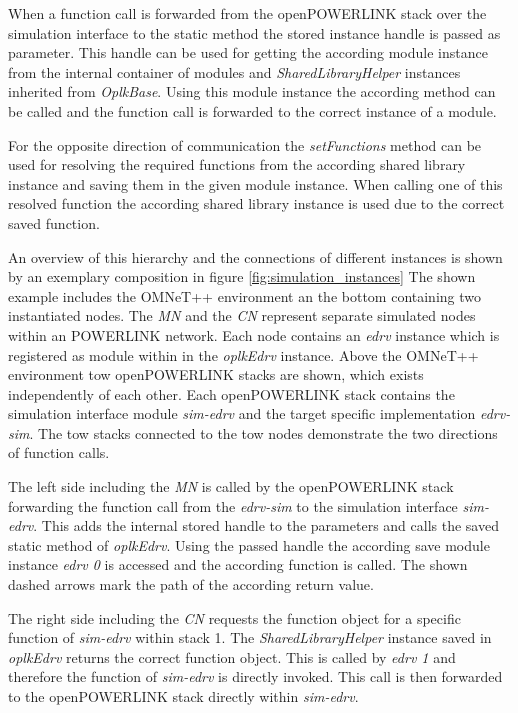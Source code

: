 When a function call is forwarded from the openPOWERLINK stack over the simulation interface to the static method the stored instance handle is passed as parameter.
This handle can be used for getting the according module instance from the internal container of modules and \emph{SharedLibraryHelper} instances inherited from \emph{OplkBase}.
Using this module instance the according method can be called and the function call is forwarded to the correct instance of a module.

For the opposite direction of communication the \emph{setFunctions} method can be used for resolving the required functions from the according shared library instance and saving them in the given module instance.
When calling one of this resolved function the according shared library instance is used due to the correct saved function.

An overview of this hierarchy and the connections of different instances is shown by an exemplary composition in figure \ref{fig:simulation_instances}
The shown example includes the OMNeT++ environment an the bottom containing two instantiated nodes.
The \emph{MN} and the \emph{CN} represent separate simulated nodes within an POWERLINK network.
Each node contains an \emph{edrv} instance which is registered as module within in the \emph{oplkEdrv} instance.
Above the OMNeT++ environment tow openPOWERLINK stacks are shown, which exists independently of each other.
Each openPOWERLINK stack contains the simulation interface module \emph{sim-edrv} and the target specific implementation \emph{edrv-sim}.
The tow stacks connected to the tow nodes demonstrate the two directions of function calls.

The left side including the \emph{MN} is called by the openPOWERLINK stack forwarding the function call from the \emph{edrv-sim} to the simulation interface \emph{sim-edrv}.
This adds the internal stored handle to the parameters and calls the saved static method of \emph{oplkEdrv}.
Using the passed handle the according save module instance \emph{edrv 0} is accessed and the according function is called.
The shown dashed arrows mark the path of the according return value.

The right side including the \emph{CN} requests the function object for a specific function of \emph{sim-edrv} within stack 1.
The \emph{SharedLibraryHelper} instance saved in \emph{oplkEdrv} returns the correct function object.
This is called by \emph{edrv 1} and therefore the function of \emph{sim-edrv} is directly invoked.
This call is then forwarded to the openPOWERLINK stack directly within \emph{sim-edrv}.

